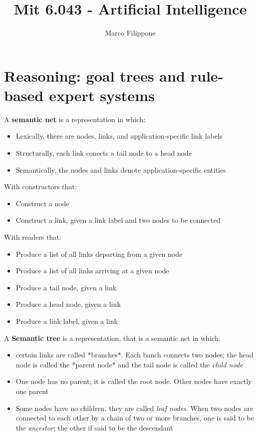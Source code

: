 \documentclass{article}
\begin{document}
\title{Mit 6.043 - Artificial Intelligence}
\author{Marco Filippone}
\maketitle

\section{Reasoning: goal trees and rule-based expert systems}

A \textbf{semantic net} is a representation in which:
\begin{itemize}
  \item Lexically, there are nodes, links, and application-specific link labels
  \item Structurally, each link conects a tail node to a head node
  \item Semantically, the nodes and links denote application-specific entities
\end{itemize}
With constructors that:
\begin{itemize}
  \item Construct a node
  \item Construct a link, given a link label and two nodes to be connected
\end{itemize}
With readers that:
\begin{itemize}
  \item Produce a list of all links departing from a given node
  \item Produce a list of all links arriving at a given node
  \item Produce a tail node, given a link
  \item Produce a head node, given a link
  \item Produce a link label, given a link
\end{itemize}

A \textbf{Semantic tree} is a representation, that is a semantic net in which:
\begin{itemize}
  \item certain links are called *branches*. Each banch connects two nodes; the head node is called the *parent node* and the tail node is called the \textit{child node}
\item One node has no parent; it is called the root node. Other nodes have exactly one parent
\item Some nodes have no children, they are called \textit{leaf nodes}. When two nodes are connected to each other by a chain of two or more branches, one is said to be the \textit{ancestor}; the other if said to be the descendant
\end{itemize}
\end{document}
